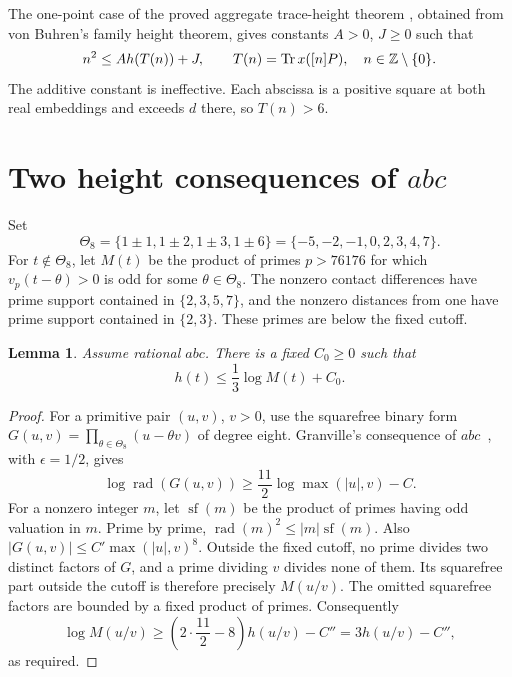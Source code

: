 \documentclass[11pt,a4paper]{article}
\newtheorem{lemma}[theorem]{Lemma}
\DeclareMathOperator{\Tr}{Tr}\DeclareMathOperator{\Nm}{N}
\DeclareMathOperator{\rad}{rad}
\begin{document}
The one-point case of the proved aggregate trace-height theorem
\cite{Trace}, obtained from von Buhren's family height theorem, gives
constants $A>0$, $J\ge0$ such that
\begin{equation}\label{eq:traceheight}
 n^2\le A h(T(n))+J,\qquad
 T(n)=\Tr x([n]P),\quad n\in\Z\setminus\{0\}.
\end{equation}
The additive constant is ineffective. Each abscissa is a positive square
at both real embeddings and exceeds $d$ there, so $T(n)>6$.

\section{Two height consequences of $abc$}

Set
\[
 \Theta_8=\{1\pm1,1\pm2,1\pm3,1\pm6\}
          =\{-5,-2,-1,0,2,3,4,7\}.
\]
For $t\notin\Theta_8$, let $M(t)$ be the product of primes $p>76176$
for which $v_p(t-\theta)>0$ is odd for some $\theta\in\Theta_8$.
The nonzero contact differences have prime support contained in
$\{2,3,5,7\}$, and the nonzero distances from one have prime support
contained in $\{2,3\}$. These primes are below the fixed cutoff.

\begin{lemma}\label{lem:contact}
Assume rational $abc$. There is a fixed $C_0\ge0$ such that
\[
                         h(t)\le\frac13\log M(t)+C_0.
\]
\end{lemma}
\begin{proof}
For a primitive pair $(u,v)$, $v>0$, use the squarefree binary form
$G(u,v)=\prod_{\theta\in\Theta_8}(u-\theta v)$ of degree eight.
Granville's consequence of $abc$~\cite[Proposition~1]{Granville},
with $\epsilon=1/2$, gives
\[
 \log\rad(G(u,v))\ge\frac{11}{2}\log\max(|u|,v)-C.
\]
For a nonzero integer $m$, let $\operatorname{sf}(m)$ be the product
of primes having odd valuation in $m$. Prime by prime,
$\rad(m)^2\le |m|\operatorname{sf}(m)$.
Also $|G(u,v)|\le C'\max(|u|,v)^8$.
Outside the fixed cutoff, no prime divides two distinct factors of
$G$, and a prime dividing $v$ divides none of them. Its squarefree
part outside the cutoff is therefore precisely $M(u/v)$.
The omitted squarefree factors are bounded by a fixed product of primes.
Consequently
\[
 \log M(u/v)\ge\left(2\cdot\frac{11}{2}-8\right)h(u/v)-C''
                 =3h(u/v)-C'',
\]
as required.
\end{proof}
\end{document}
